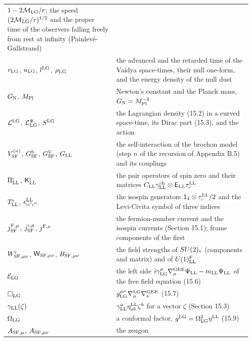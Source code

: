 \documentclass[
  10pt,
]{article}
\begin{document}
\begin{longtable}[]{@{}
  >{\raggedright\arraybackslash}p{}
  >{\raggedright\arraybackslash}p{}@{}}
\(1-2\mathcal M_{\rm LG}/r\); the speed
\((2\mathcal M_{\rm LG}/r)^{1/2}\) and the proper time of the observers
falling freely from rest at infinity (Painlevé-Gullstrand) \\
\(v_{\rm LG}\), \(u_{\rm LG}\), \(l^{\rm LG}\), \(\rho_{\rm LG}\) & the
advanced and the retarded time of the Vaidya space-times, their null
one-form, and the energy density of the null dust \\
\(G_{\rm N}\), \(M_{\rm Pl}\) & Newton's constant and the Planck mass,
\(G_{\rm N}=M_{\rm Pl}^{-2}\) \\
\(\mathcal L^{\rm LG}\), \(\mathcal L^\Psi_{\rm LG}\), \(S^{\rm LG}\) &
the Lagrangian density (15.2) in a curved space-time, its Dirac part
(15.3), and the action \\
\(V^{(n)}_{\rm SF}\), \(G^{\rm S}_{\rm SF}\), \(G^{\rm V}_{\rm SF}\),
\(G_{\rm LL}\) & the self-interaction of the brochon model (step \(n\)
of the recursion of Appendix B.5) and its couplings \\
\(\Pi^\iota_{\rm LL}\), \(\mathsf K^\iota_{\rm LL}\) & the pair
operators of spin zero and their matrices
\(C_{\rm LL}\gamma^{\rm ch}_{\rm LL}\otimes\mathsf E_{\rm LL}\tau^{\rm LL}_\iota\) \\
\(T^\iota_{\rm LL}\), \(\epsilon^{\rm LL}_{\iota\iota'\iota''}\) & the
isospin generators \(\mathsf 1_4\otimes\tau^{\rm LL}_\iota/2\) and the
Levi-Civita symbol of three indices \\
\(j^{{\rm F},\mu}_{\rm SF}\), \(j^{\iota,\mu}_{\rm SF}\),
\(j^{{\rm F},a}\) & the fermion-number current and the isospin currents
(Section 15.1); frame components of the first \\
\(W^\iota_{{\rm SF},\mu\nu}\), \(\mathsf W_{{\rm SF},\mu\nu}\),
\(B_{{\rm SF},\mu\nu}\) & the field strengths of \(SU(2)_{\rm v}\)
(components and matrix) and of \(U(1)^{\rm F}_{\rm LL}\) \\
\(\mathcal E_{\rm LG}\) & the left side
\(i\gamma^\mu_{\rm LG}\nabla^{\rm GEE}_\mu\Psi_{\rm LL}-m_{\rm LL}\Psi_{\rm LL}\)
of the free field equation (15.6) \\
\(\Box_{\rm LG}\) &
\(g_{\rm LG}^{\mu\nu}\nabla^{\rm LG}_\mu\nabla^{\rm GEE}_\nu\) (15.7) \\
\(\gamma_{\rm LL}(\zeta)\) &
\(\gamma^a_{\rm LL}\eta^{\rm LL}_{ab}\zeta^b\) for a vector \(\zeta\)
(Section 15.3) \\
\(\Omega_{\rm LG}\) & a conformal factor,
\(g^{\rm LG}=\Omega_{\rm LG}^2\eta^{\rm LL}\) (15.9) \\
\(A_{{\rm SF},\mu}\), \(A_{{\rm SF},\mu\nu}\) & the zeugon

\end{longtable}
\end{document}
